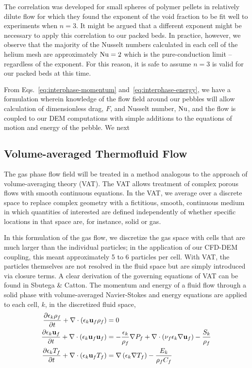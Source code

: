 The correlation was developed for small spheres of polymer pellets in relatively dilute flow for which they found the exponent of the void fraction to be fit well to experiments when $n=3$. It might be argued that a different exponent might be necessary to apply this correlation to our packed beds. In practice, however, we observe that the majority of the Nusselt numbers calculated in each cell of the helium mesh are approximately $\Nu = 2$ which is the pure-conduction limit -- regardless of the exponent. For this reason, it is safe to assume $n=3$ is valid for our packed beds at this time.

From Eqs.~\ref{eq:interphase-momentum} and~\ref{eq:interphase-energy}, we have a formulation wherein knowledge of the flow field around our pebbles will allow calculation of dimensionless drag, $F$, and Nusselt number, $\Nu$, and the flow is coupled to our DEM computations with simple additions to the equations of motion and energy of the pebble. We next 




\subsection{Volume-averaged Thermofluid Flow}

The gas phase flow field will be treated in a method analogous to the approach of volume-averaging theory (VAT).\cite{Sbutega2013,whitaker1999method,Tsuji1992} The VAT allows treatment of complex porous flows with smooth continuous equations. In the VAT, we average over a discrete space to replace complex geometry with a fictitious, smooth, continuous medium in which quantities of interested are defined independently of whether specific locations in that space are, for instance, solid or gas.

In this formulation of the gas flow, we discretize the gas space with cells that are much larger than the individual particles; in the application of our CFD-DEM coupling, this meant approximately 5 to 6 particles per cell. With VAT, the particles themselves are not resolved in the fluid space but are simply introduced via closure terms.\cite{Sbutega2013,Horvat2006} A clear derivation of the governing equations of VAT can be found in Sbutega \& Catton\cite{Sbutega2013}. The momentum and energy of a fluid flow through a solid phase with volume-averaged Navier-Stokes and energy equations are applied to each cell, $k$, in the discretized fluid space,
\begin{subequations}\label{eq:cfd-equations}
\begin{align}
\pder[\epsilon_k \rho_f]{t} + \nabla\cdot(\epsilon_k \vec{u}_f \rho_f) &= 0\\
\pder[\epsilon_k \vec{u}_f]{t} + \nabla\cdot(\epsilon_k \vec{u}_f \vec{u}_f) &= -\frac{\epsilon_k}{\rho_f}\nabla P_f + \nabla\cdot\left(\nu_f\epsilon_k\nabla \vec{u}_f\right) - \frac{S_k}{\rho_f}\\
\pder[\epsilon_k T_f]{t} + \nabla\cdot(\epsilon_k \vec{u}_f T_f) &= \nabla\left(\epsilon_k\nabla T_f\right)-\frac{E_k}{\rho_fC_f}
\end{align}
\end{subequations}

